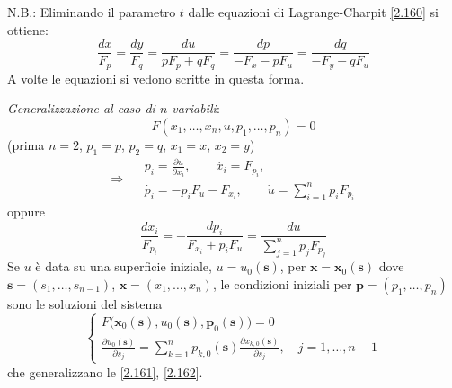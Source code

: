 \documentclass[a4paper,11pt]{report}
\newcommand{\vect}[1]{\boldsymbol{#1}}
\newcommand{\x}{\boldsymbol{x}}
\begin{document}
\medskip

N.B.: Eliminando il parametro $t$ dalle equazioni di Lagrange-Charpit \eqref{2.160} si ottiene:
\begin{equation}
\frac{dx}{F_p}=\frac{dy}{F_q}=\frac{du}{pF_p + qF_q}=\frac{dp}{-F_x - pF_u} = \frac{dq}{-F_y - qF_u} 
\label{2.168}
\end{equation}
A volte le equazioni si vedono scritte in questa forma.

\medskip

\emph{Generalizzazione al caso di $n$ variabili}:
\begin{equation}
F(x_1,\dots,x_n,u,p_1,\dots,p_n)=0 
\label{2.169}
\end{equation}
(prima $n=2$, $p_1=p$, $p_2=q$, $x_1=x$, $x_2=y$)
\begin{equation}
\Rightarrow\quad \begin{gathered}
p_i=\frac{\partial u}{\partial x_i}, \qquad \dot{x_i} = F_{p_i}, \\
\dot{p_i}= - p_i F_u -F_{x_i}, \qquad \dot{u}=\sum_{i=1}^n p_i F_{p_i}
\end{gathered}
\label{2.170}
\end{equation}
oppure 
\[
\frac{dx_i}{F_{p_i}}=-\frac{dp_i}{F_{x_i} + p_iF_u}=\frac{du}{\sum_{j=1}^n p_j F_{p_j}}
\]
Se $u$ \`e data su una superficie iniziale, $u=u_0(\vect{s})$, per $\x = \x_0(\vect{s})$ dove $\vect{s}=(s_1,\dots,s_{n-1})$, 
$\x=(x_1,\dots,x_n)$, le condizioni iniziali per $\vect{p}=(p_1,\dots,p_n)$ sono le soluzioni del sistema
\begin{equation}
\begin{cases}
F \big(\x_0(\vect{s}),u_0(\vect{s}), \vect{p}_0(\vect{s}) \big)=0\\
\frac{\partial u_0(\vect{s})}{\partial s_j}=\sum_{k=1}^n p_{k,0}(\vect{s})\frac{\partial x_{k,0}(\vect{s})}{\partial s_j}, \quad j=1,\dots,n-1
\end{cases} 
\label{2.170'}
\tag{$\theequation'$}
\end{equation}
che generalizzano le \eqref{2.161}, \eqref{2.162}.

\medskip
\end{document}
